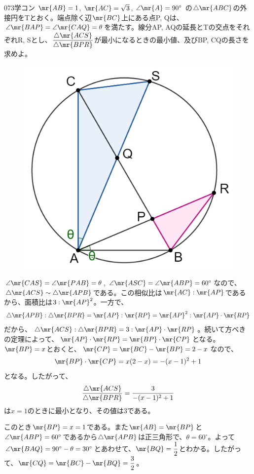 \begin{thm}{073}{}{学コン}
 $\mr{AB}=1$, $\mr{AC}=\sqrt{3}$, $\angle\mr{A}=90^\circ$ の$\triangle\mr{ABC}$の外接円をTとおく。端点除く辺$\mr{BC}$上にある点P, Qは、$\angle\mr{BAP}=\angle\mr{CAQ}=\theta$を満たす。線分AP, AQの延長とTの交点をそれぞれR, Sとし、$\dfrac{\triangle\mr{ACS}}{\triangle\mr{BPR}}$が最小になるときの最小値、及びBP, CQの長さを求めよ。
\end{thm}

\begin{figure}[H]
 \centering
 \includegraphics[width=0.5\linewidth]{../problems/Q_073/A_073.png}
\end{figure}
$\angle\mr{CAS}=\angle\mr{PAB}=\theta$, $\angle\mr{ASC}=\angle\mr{ABP}=60^\circ$なので、$\triangle\mr{ACS}\sim\triangle\mr{APB}$である。この相似比は$\mr{AC}:\mr{AP}$であるから、面積比は$3:\mr{AP}^2$。一方で、
\[ \triangle\mr{APB}:\triangle\mr{BPR} = \mr{AP}:\mr{RP} = \mr{AP}^2:\mr{AP}\cdot\mr{RP} \]
だから、$\triangle\mr{ACS}:\triangle\mr{BPR}=3:\mr{AP}\cdot\mr{RP}$。続いて方べきの定理によって、$\mr{AP}\cdot\mr{RP}=\mr{BP}\cdot\mr{CP}$となる。$\mr{BP}=x$とおくと、$\mr{CP}=\mr{BC}-\mr{BP}=2-x$なので、
\[ \mr{BP}\cdot\mr{CP}=x(2-x)=-(x-1)^2+1 \]
となる。したがって、
\[ \frac{\triangle\mr{ACS}}{\triangle\mr{BPR}}=\frac{3}{-(x-1)^2+1} \]
は$x=1$のときに最小となり、その値は$3$である。

このとき$\mr{BP}=x=1$である。また$\mr{AB}=\mr{BP}$と$\angle\mr{ABP}=60^\circ$であるから$\triangle\mr{APB}$は正三角形で、$\theta=60^\circ$。よって$\angle\mr{BAQ}=90^\circ-\theta=30^\circ$とあわせて、$\mr{BQ}=\dfrac{1}{2}$とわかる。したがって、$\mr{CQ}=\mr{BC}-\mr{BQ}=\dfrac{3}{2}$。